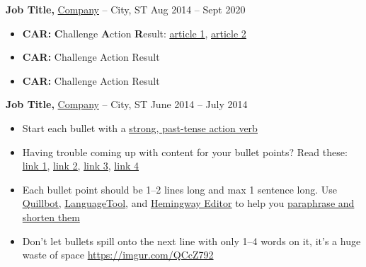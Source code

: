 \documentclass[11pt]{article}       %
\begin{document}
\textbf{Job Title,} \href{https://www.fstl1992.com/}{Company} -- City, ST \hfill Aug 2014 -- Sept 2020 \\
\vspace{-9pt}
\begin{itemize}
  \item \textbf{CAR:} \textbf{C}hallenge \textbf{A}ction \textbf{R}esult: \href{https://ca.indeed.com/career-advice/resumes-cover-letters/challenge-action-result-resume}{\underline{article 1}}, \href{https://www.topresume.com/career-advice/how-to-get-more-results-with-a-car-resume}{\underline{article 2}}
  \item \textbf{CAR:} Challenge Action Result
  \item \textbf{CAR:} Challenge Action Result
\end{itemize}

\textbf{Job Title,} \href{https://www.fstl1992.com/}{Company} -- City, ST \hfill June 2014 -- July 2014 \\
\vspace{-9pt}
\begin{itemize}
  \item Start each bullet with a \href{https://old.reddit.com/r/EngineeringResumes/wiki/index\#wiki_action_verbs}{\underline{strong, past-tense action verb}}
  \item Having trouble coming up with content for your bullet points? Read these: \href{https://old.reddit.com/r/EngineeringResumes/wiki/index\#wiki_having_trouble_coming_up_with_content_for_your_bullet_points.3F_ask_yourself_the_following_questions.3A}{\underline{link 1}}, \href{https://old.reddit.com/r/EngineeringResumes/wiki/index\#wiki_got_writer.27s_block_from_looking_at_star.2Fcar.2Fxyz.3F}{\underline{link 2}}, \href{https://archive.ph/Xmdqt}{\underline{link 3}}, \href{https://old.reddit.com/r/EngineeringResumes/wiki/sample-bullet-points}{\underline{link 4}}
  \item Each bullet point should be 1--2 lines long and max 1 sentence long. Use \href{https://quillbot.com/}{\underline{Quillbot}}, \href{https://languagetool.org/paraphrasing-tool}{\underline{LanguageTool}}, and \href{https://hemingwayapp.com/}{\underline{Hemingway Editor}} to help you \href{https://www.youtube.com/watch?v=VvPaEsuz-tY}{paraphrase and shorten them}
  \item Don't let bullets spill onto the next line with only 1--4 words on it, it's a huge waste of space \url{https://imgur.com/QCcZ792}
\end{itemize}
\end{document}
